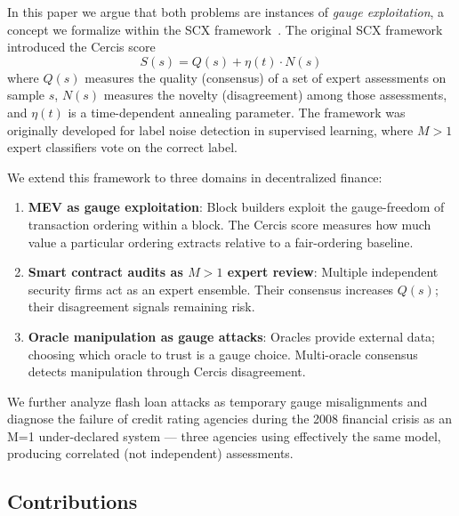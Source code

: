 \documentclass[12pt,a4paper]{article}
\theoremstyle{remark}
\newcommand{\Cercis}{\textsf{Cercis}}
\begin{document}
In this paper we argue that both problems are instances of \emph{gauge
exploitation}, a concept we formalize within the SCX
framework~\cite{scx2025,yajie2025,spring2025}. The original SCX framework
introduced the \Cercis{} score
\begin{equation}
S(s) = Q(s) + \eta(t) \cdot N(s)
\label{eq:cercis}
\end{equation}
where $Q(s)$ measures the quality (consensus) of a set of expert assessments on
sample $s$, $N(s)$ measures the novelty (disagreement) among those assessments,
and $\eta(t)$ is a time-dependent annealing parameter. The framework was
originally developed for label noise detection in supervised learning, where
$M>1$ expert classifiers vote on the correct label.

We extend this framework to three domains in decentralized finance:
\begin{enumerate}
\item \textbf{MEV as gauge exploitation}: Block builders exploit the
gauge-freedom of transaction ordering within a block. The \Cercis{} score
measures how much value a particular ordering extracts relative to a
fair-ordering baseline.
\item \textbf{Smart contract audits as $M>1$ expert review}: Multiple
independent security firms act as an expert ensemble. Their consensus
increases $Q(s)$; their disagreement signals remaining risk.
\item \textbf{Oracle manipulation as gauge attacks}: Oracles provide external
data; choosing which oracle to trust is a gauge choice. Multi-oracle
consensus detects manipulation through \Cercis{} disagreement.
\end{enumerate}

We further analyze flash loan attacks as temporary gauge misalignments and
diagnose the failure of credit rating agencies during the 2008 financial crisis
as an M=1 under-declared system --- three agencies using effectively the same
model, producing correlated (not independent) assessments.

\subsection{Contributions}
\end{document}
